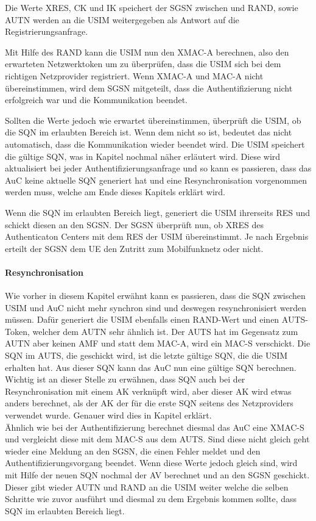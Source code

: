  Die Werte XRES, CK und IK speichert der SGSN zwischen und RAND, sowie AUTN werden an die USIM
 weitergegeben als Antwort auf die Registrierungsanfrage.

 Mit Hilfe des RAND kann die USIM nun den XMAC-A berechnen, also den erwarteten Netzwerktoken um
 zu überprüfen, dass die USIM sich bei dem richtigen Netzprovider registriert. Wenn XMAC-A
 und MAC-A nicht übereinstimmen, wird dem SGSN mitgeteilt, dass die Authentifizierung nicht erfolgreich
 war und die Kommunikation beendet.

 Sollten die Werte jedoch wie erwartet übereinstimmen, überprüft die USIM, ob die SQN im erlaubten
 Bereich ist. Wenn dem nicht so ist, bedeutet das nicht automatisch, dass die Kommunikation wieder
 beendet wird. Die USIM speichert die gültige SQN, was in Kapitel 
 nochmal näher erläutert wird. Diese wird aktualisiert bei jeder Authentifizierungsanfrage und so kann
 es passieren, dass das AuC keine aktuelle SQN generiert hat und eine Resynchronisation vorgenommen
 werden muss, welche am Ende dieses Kapitels erklärt wird.
 
 Wenn die SQN im erlaubten Bereich liegt, generiert die USIM ihrerseits RES und schickt diesen an
 den SGSN. Der SGSN überprüft nun, ob XRES des Authenticaton Centers mit dem RES der USIM
 übereinstimmt. Je nach Ergebnis erteilt der SGSN dem \ac{UE} den Zutritt zum Mobilfunknetz oder
 nicht.
 
 \paragraph{Resynchronisation}
 \label{par:resynchronisation}
  Wie vorher in diesem Kapitel erwähnt kann es passieren, dass die SQN zwischen USIM und AuC
  nicht mehr synchron sind und deswegen resynchronisiert werden müssen. Dafür generiert die
  USIM ebenfalls einen RAND-Wert und einen AUTS-Token, welcher dem AUTN sehr ähnlich ist.
  Der AUTS hat im Gegensatz zum AUTN aber keinen AMF und statt dem MAC-A, wird ein MAC-S
  verschickt. Die SQN im AUTS, die geschickt wird, ist die letzte gültige SQN, die die USIM erhalten
  hat. Aus dieser SQN kann das AuC nun eine gültige SQN berechnen. Wichtig ist an dieser
  Stelle zu erwähnen, dass SQN auch bei der Resynchronisation mit einem AK verknüpft wird,
  aber dieser AK wird etwas anders berechnet, als der AK der für die erste SQN seitens des
  Netzproviders verwendet wurde. Genauer wird dies in Kapitel 
  erklärt.\\
  Ähnlich wie bei der Authentifizierung berechnet diesmal das AuC eine XMAC-S und vergleicht
  diese mit dem MAC-S aus dem AUTS. Sind diese nicht gleich geht wieder eine Meldung an den
  SGSN, die einen Fehler meldet und den Authentifizierungsvorgang beendet. Wenn diese Werte
  jedoch gleich sind, wird mit Hilfe der neuen SQN nochmal der AV berechnet und an den SGSN
  geschickt. Dieser gibt wieder AUTN und RAND an die USIM weiter welche die selben Schritte
  wie zuvor ausführt und diesmal zu dem Ergebnis kommen sollte, dass SQN im erlaubten
  Bereich liegt.
  
